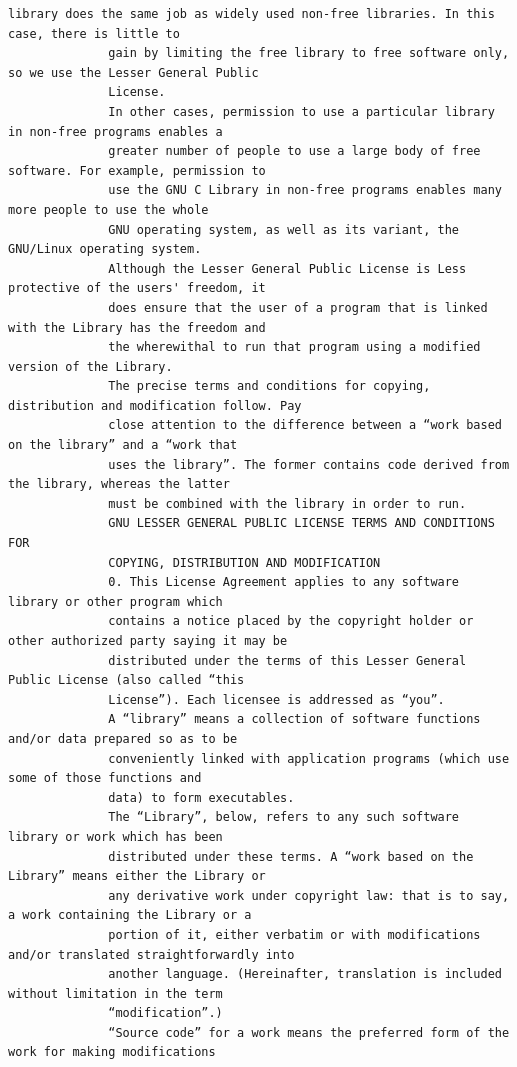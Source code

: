 \begin{lstlisting}[basicstyle=\ttfamily\scriptsize,breaklines=true]
              library does the same job as widely used non-free libraries. In this case, there is little to
              gain by limiting the free library to free software only, so we use the Lesser General Public
              License.
              In other cases, permission to use a particular library in non-free programs enables a
              greater number of people to use a large body of free software. For example, permission to
              use the GNU C Library in non-free programs enables many more people to use the whole
              GNU operating system, as well as its variant, the GNU/Linux operating system.
              Although the Lesser General Public License is Less protective of the users' freedom, it
              does ensure that the user of a program that is linked with the Library has the freedom and
              the wherewithal to run that program using a modified version of the Library.
              The precise terms and conditions for copying, distribution and modification follow. Pay
              close attention to the difference between a “work based on the library” and a “work that
              uses the library”. The former contains code derived from the library, whereas the latter
              must be combined with the library in order to run.
              GNU LESSER GENERAL PUBLIC LICENSE TERMS AND CONDITIONS FOR
              COPYING, DISTRIBUTION AND MODIFICATION
              0. This License Agreement applies to any software library or other program which
              contains a notice placed by the copyright holder or other authorized party saying it may be
              distributed under the terms of this Lesser General Public License (also called “this
              License”). Each licensee is addressed as “you”.
              A “library” means a collection of software functions and/or data prepared so as to be
              conveniently linked with application programs (which use some of those functions and
              data) to form executables.
              The “Library”, below, refers to any such software library or work which has been
              distributed under these terms. A “work based on the Library” means either the Library or
              any derivative work under copyright law: that is to say, a work containing the Library or a
              portion of it, either verbatim or with modifications and/or translated straightforwardly into
              another language. (Hereinafter, translation is included without limitation in the term
              “modification”.)
              “Source code” for a work means the preferred form of the work for making modifications

\end{lstlisting}
